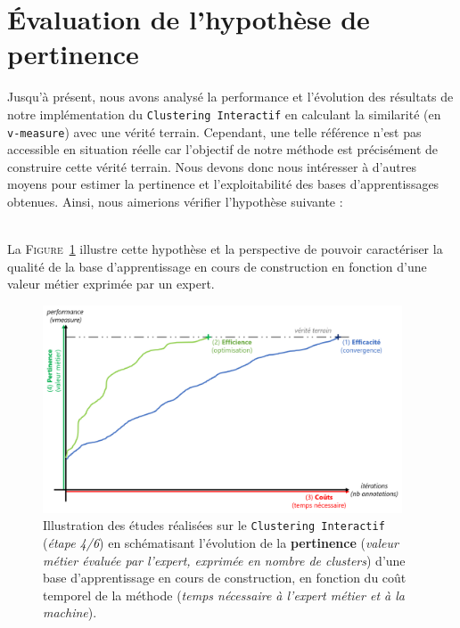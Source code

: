 \section{Évaluation de l'hypothèse de pertinence}
\label{section:4.4-HYPOTHESE-PERTINENCE}

	Jusqu'à présent, nous avons analysé la performance et l'évolution des résultats de notre implémentation du \texttt{Clustering Interactif} en calculant la similarité (en \texttt{v-measure}) avec une vérité terrain.
	Cependant, une telle référence n'est pas accessible en situation réelle car l'objectif de notre méthode est précisément de construire cette vérité terrain.
	Nous devons donc nous intéresser à d'autres moyens pour estimer la pertinence et l'exploitabilité des bases d'apprentissages obtenues.
	Ainsi, nous aimerions vérifier l'hypothèse suivante :
	
	\begin{tcolorbox}[
		title=\faVial~\textbf{Hypothèse de pertinence}~\faVial,
		colback=colorTcolorboxHypothesis!15,
		colframe=colorTcolorboxHypothesis!75,
		width=\linewidth
	]
		 \\
		
		La \textsc{Figure~\ref{figure:4.4-HYPOTHESE-PERTINENCE}} illustre cette hypothèse et la perspective de pouvoir caractériser la qualité de la base d'apprentissage en cours de construction en fonction d'une valeur métier exprimée par un expert.
		\begin{figure}[H]  %
			\centering
			\includegraphics[width=0.95\textwidth]{figures/hypotheses-04-pertinence}
			\caption{
				Illustration des études réalisées sur le \texttt{Clustering Interactif} (\textit{étape 4/6}) en schématisant l'évolution de la \textbf{pertinence} (\textit{valeur métier évaluée par l'expert, exprimée en nombre de clusters}) d'une base d'apprentissage en cours de construction, en fonction du coût temporel de la méthode (\textit{temps nécessaire à l'expert métier et à la machine}).
			}
			\label{figure:4.4-HYPOTHESE-PERTINENCE}
		\end{figure}
	\end{tcolorbox}
		
